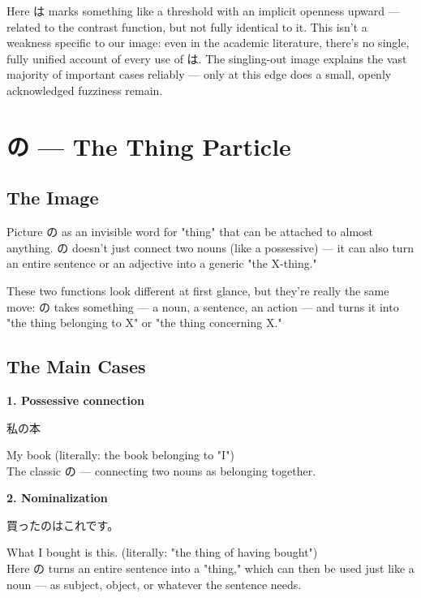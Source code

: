 \documentclass[12pt]{book}
\begin{document}
Here は marks something like a threshold with an implicit openness upward — related to the contrast function, but not fully identical to it. This isn't a weakness specific to our image: even in the academic literature, there's no single, fully unified account of every use of は. The singling-out image explains the vast majority of important cases reliably — only at this edge does a small, openly acknowledged fuzziness remain.


\chapter{の — The Thing Particle}

\section*{The Image}

Picture の as an invisible word for "thing" that can be attached to almost anything. の doesn't just connect two nouns (like a possessive) — it can also turn an entire sentence or an adjective into a generic "the X-thing."

These two functions look different at first glance, but they're really the same move: の takes something — a noun, a sentence, an action — and turns it into "the thing belonging to X" or "the thing concerning X."

\section*{The Main Cases}

\textbf{1. Possessive connection}
\par\quad 私の本\\
\par\quad My book (literally: the book belonging to "I")\\

The classic の — connecting two nouns as belonging together.

\textbf{2. Nominalization}
\par\quad 買ったのはこれです。\\
\par\quad What I bought is this. (literally: "the thing of having bought")\\

Here の turns an entire sentence into a "thing," which can then be used just like a noun — as subject, object, or whatever the sentence needs.
\end{document}
